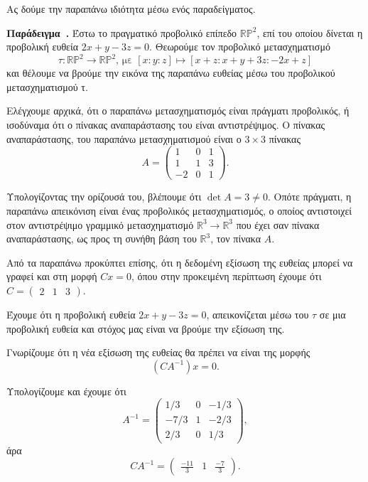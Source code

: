 \documentclass[12pt, a4paper]{book}
\newcounter{example}[section]
\newenvironment{example}[1][]{\refstepcounter{example}\par\medskip
   \textbf{Παράδειγμα~\theexample. #1} \rmfamily}{\medskip}
\begin{document}
Ας δούμε την παραπάνω ιδιότητα μέσω ενός παραδείγματος.

\begin{example}
Έστω το πραγματικό προβολικό επίπεδο $\mathbb{R}\mathbb{P}^2$, επί του οποίου δίνεται η προβολική ευθεία $2x+y-3z =0$. Θεωρούμε τον προβολικό μετασχηματισμό
\begin{displaymath}
τ: \mathbb{R}\mathbb{P}^2 \rightarrow \mathbb{R}\mathbb{P}^2 \text{, με } [x:y:z] \mapsto [x+z:x+y+3z:-2x+z]
\end{displaymath}
και θέλουμε να βρούμε την εικόνα της παραπάνω ευθείας μέσω του προβολικού μετασχηματισμού τ.

Ελέγχουμε αρχικά, ότι ο παραπάνω μετασχηματισμός είναι πράγματι προβολικός, ή ισοδύναμα ότι ο πίνακας αναπαράστασης του είναι αντιστρέψιμος. Ο πίνακας αναπαράστασης, του παραπάνω μετασχηματισμού είναι ο $3\times3$ πίνακας 
\begin{displaymath}
A = 
\begin{pmatrix}
1&0&1\\1&1&3\\-2&0&1
\end{pmatrix}.
\end{displaymath}

Υπολογίζοντας την ορίζουσά του, βλέπουμε ότι $\det{A} = 3 \neq 0$. Οπότε πράγματι, η παραπάνω απεικόνιση είναι ένας προβολικός μετασχηματισμός, ο οποίος αντιστοιχεί στον αντιστρέψιμο γραμμικό μετασχηματισμό $\mathbb{R}^3 \rightarrow \mathbb{R}^3$ που έχει σαν πίνακα αναπαράστασης, ως προς τη συνήθη βάση του $\mathbb{R}^3$, τον πίνακα $Α$.

Από τα παραπάνω προκύπτει επίσης, ότι η δεδομένη εξίσωση της ευθείας μπορεί να γραφεί και στη μορφή $Cx =0$,  όπου στην προκειμένη περίπτωση έχουμε ότι \\ $C =\begin{pmatrix} 2&1&3\end{pmatrix}$. 

Έχουμε ότι η προβολική ευθεία $2x+y-3z=0$, απεικονίζεται μέσω του $τ$ σε μια προβολική ευθεία και στόχος μας είναι να βρούμε την εξίσωση της. 

Γνωρίζουμε ότι η νέα εξίσωση της ευθείας θα πρέπει να είναι της μορφής
\begin{displaymath}
(CA^{-1})x =0.
\end{displaymath}

Υπολογίζουμε και έχουμε ότι
\begin{displaymath}
A^{-1} =
\begin{pmatrix}
1/3 & 0 & -1/3 \\
-7/3 & 1 & -2/3 \\
2/3 & 0 & 1/3
\end{pmatrix},
\end{displaymath}
άρα
\begin{displaymath}
CA^{-1}=
\begin{pmatrix}
\frac{-11}{3} & 1 & \frac{-7}{3}
\end{pmatrix}.
\end{displaymath}


\end{example}
\end{document}
